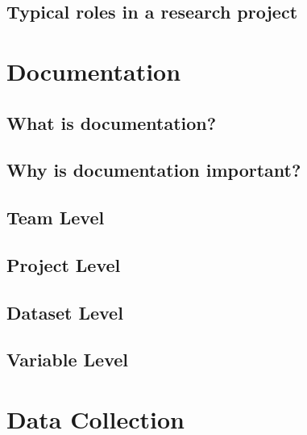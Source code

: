 \documentclass[
]{book}
\begin{document}
\hypertarget{typical-roles-in-a-research-project}{%
\section{Typical roles in a research project}\label{typical-roles-in-a-research-project}}

\hypertarget{documentation}{%
\chapter{Documentation}\label{documentation}}

\hypertarget{what-is-documentation}{%
\section{What is documentation?}\label{what-is-documentation}}

\hypertarget{why-is-documentation-important}{%
\section{Why is documentation important?}\label{why-is-documentation-important}}

\hypertarget{team-level}{%
\section{Team Level}\label{team-level}}

\hypertarget{project-level}{%
\section{Project Level}\label{project-level}}

\hypertarget{dataset-level}{%
\section{Dataset Level}\label{dataset-level}}

\hypertarget{variable-level}{%
\section{Variable Level}\label{variable-level}}

\hypertarget{data-collection}{%
\chapter{Data Collection}\label{data-collection}}
\end{document}
